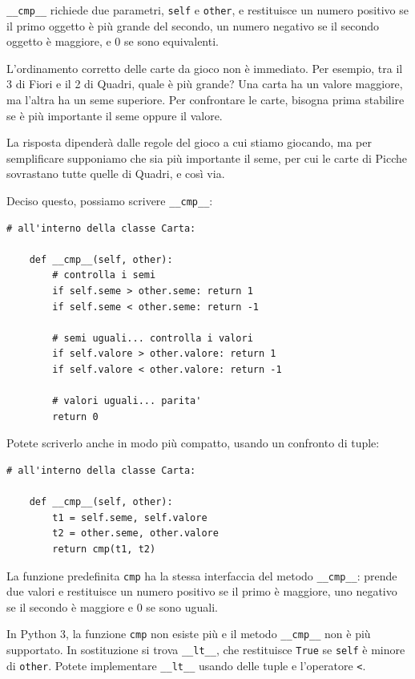 \documentclass[10pt]{book}
\begin{document}
\verb"__cmp__" richiede due parametri, {\tt self} e {\tt other},
e restituisce un numero positivo se il primo oggetto è più grande del secondo, un numero negativo se il secondo oggetto è maggiore, e 0 se sono equivalenti.

L'ordinamento corretto delle carte da gioco non è immediato. Per esempio, tra il 3 di Fiori e il 2 di Quadri, quale è più grande? Una carta ha un valore maggiore, ma l'altra ha un seme superiore. Per confrontare le carte, bisogna prima stabilire se è più importante il seme oppure il valore.

La risposta dipenderà dalle regole del gioco a cui stiamo giocando, ma per semplificare supponiamo che sia più importante il seme, per cui le carte di Picche sovrastano tutte quelle di Quadri, e così via.

Deciso questo, possiamo scrivere \verb"__cmp__":

\begin{verbatim}
# all'interno della classe Carta:

    def __cmp__(self, other):
        # controlla i semi
        if self.seme > other.seme: return 1
        if self.seme < other.seme: return -1

        # semi uguali... controlla i valori
        if self.valore > other.valore: return 1
        if self.valore < other.valore: return -1

        # valori uguali... parita'
        return 0    
\end{verbatim}
%
Potete scriverlo anche in modo più compatto, usando un confronto di tuple:

\begin{verbatim}
# all'interno della classe Carta:

    def __cmp__(self, other):
        t1 = self.seme, self.valore
        t2 = other.seme, other.valore
        return cmp(t1, t2)
\end{verbatim}
%
La funzione predefinita {\tt cmp} ha la stessa interfaccia del metodo \verb"__cmp__": prende due valori e restituisce un numero positivo se il primo è maggiore, uno negativo se il secondo è maggiore e 0 se sono uguali.

In Python 3, la funzione {\tt cmp} non esiste più e il metodo \verb"__cmp__"
non è più supportato. In sostituzione si trova \verb"__lt__",
che restituisce {\tt True} se {\tt self} è minore di {\tt other}.
Potete implementare \verb"__lt__" usando delle tuple e l'operatore \verb"<".
\end{document}
